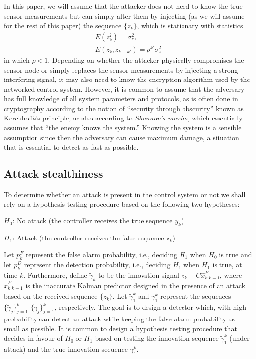 \documentclass[journal,10pt]{IEEEtran}
\begin{document}
In this paper, we will assume that the attacker does not need to know the true sensor measurements but can simply alter them by injecting (as we will assume for the rest of this paper) the sequence
$\{z_{k}\}$, which is stationary with statistics
\begin{eqnarray}
E(z_{k}^{2})=\sigma_{z}^{2},\\
E(z_{k},z_{k-k'})=\rho^{k'}\sigma_{z}^{2}\label{zcorrelation}
\end{eqnarray}
in which $\rho<1$. Depending on whether the attacker physically compromises the sensor node or simply replaces the sensor measurements by injecting a strong interfering signal, it may also need to know the encryption algorithm used by the networked control system. However, it is  common to assume that the adversary has full knowledge of all system parameters and protocols, as is often done in cryptography according to the notion of ``security through obscurity'' known as Kerckhoffs's principle, or also according to {\em Shannon's maxim}, which essentially assumes that 
``the enemy knows the system.'' {\black Knowing the system is a sensible assumption since then the adversary can cause maximum damage, a situation that is essential to detect as fast as possible. }


\subsection{Attack stealthiness}
To determine whether an attack is present in the control system or not we shall rely on a hypothesis
testing procedure based on  the following two hypotheses: \vspace{.25cm}

$H_{0}$: No attack (the controller receives the true sequence $y_{k}$)
\vspace{.5mm}

    $H_{1}$: Attack (the controller receives the false sequence $z_{k}$)
\vspace{.25cm}

Let $p_{k}^{F}$ represent the false alarm probability, i.e., deciding $H_{1}$
when $H_{0}$ is true and let $p_{k}^{D}$ represent the detection probability, i.e., deciding $H_{1}$ when $H_{1}$ is true, at time $k$. Furthermore, define $\widetilde{\gamma}_k$ to be the innovation signal $z_k - C \hat x^F_{k|k-1}$, where 
$ \hat x^F_{k|k-1}$ is the inaccurate Kalman predictor designed in the presence of an attack based on the received sequence $\{z_k\}$. 
Let $\widetilde{\gamma}_{1}^{k}$ and $\gamma_{1}^{k}$ represent the sequences $\{\widetilde{\gamma}_j\}_{j=1}^{k}$ $\{\gamma_j\}_{j=1}^{k}$, respectively.
The goal is to design a detector which, with high probability can detect an attack while keeping the false alarm probability as small as possible. It is common to design a hypothesis testing procedure that decides in favour of $H_0$ or $H_1$ 
based on testing the innovation sequence $\widetilde{\gamma}_{1}^{k}$ (under attack) and the true innovation sequence 
$\gamma_{1}^{k}$. 
\end{document}
